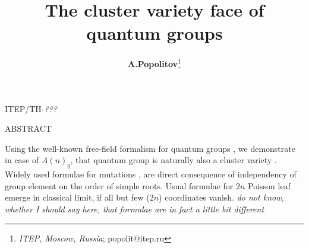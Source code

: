 \documentclass{article}
\title{{\bf The cluster variety face of quantum groups} \vspace{.2cm}}
\author{{\bf A.Popolitov}\thanks{{\small
{\it ITEP, Moscow, Russia}}; popolit@itep.ru}}
\newcommand {\?}{\textit{???}}
\newcommand{\YAMLSectionize}[1]{}
\begin{document}
 \maketitle

\vspace{-5.0cm}

\begin{center}
\hfill ITEP/TH-\?\\
\end{center}

\vspace{3.5cm}

\centerline{ABSTRACT}

\bigskip

{\footnotesize
Using the well-known free-field formalism for quantum groups \cite{MV1}, we demonstrate
in case of $A(n)_q$, that quantum group is naturally also a cluster variety \cite{FG1}.
Widely used \cite{Hik1} formulae for mutations \cite{FG1},\cite{FG2} are
direct consequence of independency of group element on the order of simple roots.
Usual formulae \cite{Mars1} for $2 n$ Poisson leaf emerge in classical limit,
if all but few ($2n$) coordinates vanish.
{\it do not know, whether I should say here, that formulae are in fact a little
bit different}
}


\YAMLSectionize{
# The sketch and logic of the presentation
- Introduction :
  - first a blah-blah-blah on how quantum groups are great and important objects,
    and cluster varieties - even more important
  - convenient MV parametrization of group element and commutational relations
  - convenient MFG parametrization of group element
  - mutations
- Body :
  - Details :
    commutational relations for dual algebra from comultiplication :
      - brief overview of original Morozov-Vinet
      - derivation for sl(2)
      - derivation for sl(3)
      - derivation for sl(n)
    connection between multicartan and Gauss parametrization
      - sl(2)
      - sl(n)
    commutational relations for multicartan parametrization
      - sl(2)
      - sl(n)
    mutations
      - sl(2) fundamental
      - sl(n) fundamental reduces to sl(2)
      - sl(2) first symmetrical
- Conclusion
}

\bigskip

\bigskip

\end{document}
